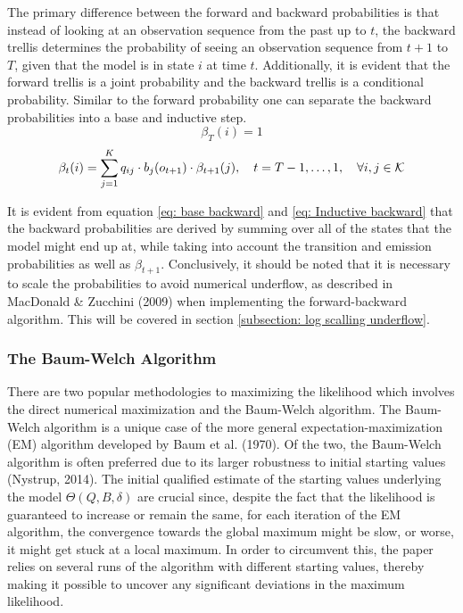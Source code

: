 The primary difference between the forward and backward probabilities is that instead of looking at an observation sequence from the past up to $t$, the backward trellis determines the probability of seeing an observation sequence from $t+1$ to $T$, given that the model is in state $i$ at time $t$. Additionally, it is evident that the forward trellis is a joint probability and the backward trellis is a conditional probability. Similar to the forward probability one can separate the backward probabilities into a base and inductive step. 
\begin{equation}
    \beta_T(i) = 1 %
    \label{eq: base backward}
\end{equation}
\begin{equation}
   \beta_t(i) = \sum_{j=1}^K q_{ij}\cdot b_j(o_{t+1})\cdot \beta_{t+1}(j),
   \quad t = T-1,\ldots,1,
   \quad \forall i,j \in\operatorname{\mathcal{K}}
    \label{eq: Inductive backward}
\end{equation}

It is evident from equation \ref{eq: base backward} and \ref{eq: Inductive backward} that the backward probabilities are derived by summing over all of the states that the model might end up at, while taking into account the transition and emission probabilities as well as $\beta_{t+1}$. Conclusively, it should be noted that it is necessary to scale the probabilities to avoid numerical underflow, as described in MacDonald \& Zucchini (2009) when implementing the forward-backward algorithm. This will be covered in section \ref{subsection: log scalling underflow}. 

\subsubsection{The Baum-Welch Algorithm}
There are two popular methodologies to maximizing the likelihood which involves the direct numerical maximization and the Baum-Welch algorithm. The Baum-Welch algorithm is a unique case of the more general expectation-maximization (EM) algorithm developed by Baum et al. (1970). Of the two, the Baum-Welch algorithm is often preferred due to its larger robustness to initial starting values (Nystrup, 2014). The initial qualified estimate of the starting values underlying the model $\Theta(Q,B,\delta)$ are crucial since, despite the fact that the likelihood is guaranteed to increase or remain the same, for each iteration of the EM algorithm, the convergence towards the global maximum might be slow, or worse, it might get stuck at a local maximum. In order to circumvent this, the paper relies on several runs of the algorithm with different starting values, thereby making it possible to uncover any significant deviations in the maximum likelihood. 

